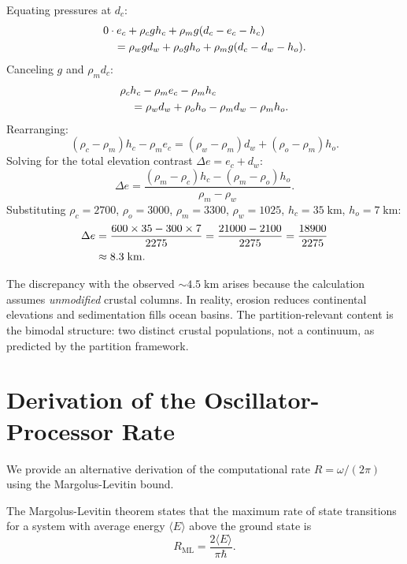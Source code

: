 \documentclass[10pt,twocolumn]{article}
\theoremstyle{definition}
\theoremstyle{remark}
\begin{document}
Equating pressures at $d_c$:
\begin{align}
  &0\cdot e_c + \rho_c g h_c + \rho_m g(d_c - e_c - h_c)\notag\\
  &\quad = \rho_w g d_w + \rho_o g h_o + \rho_m g(d_c - d_w - h_o).
\end{align}
Canceling $g$ and $\rho_m d_c$:
\begin{align}
  &\rho_c h_c - \rho_m e_c - \rho_m h_c\notag\\
  &\quad = \rho_w d_w + \rho_o h_o - \rho_m d_w - \rho_m h_o.
\end{align}
Rearranging:
\begin{equation}
  (\rho_c - \rho_m)h_c - \rho_m e_c
  = (\rho_w - \rho_m)d_w + (\rho_o - \rho_m)h_o.
\end{equation}
Solving for the total elevation contrast
$\Delta e = e_c + d_w$:
\begin{equation}
  \Delta e = \frac{(\rho_m-\rho_c)h_c - (\rho_m-\rho_o)h_o}
                  {\rho_m - \rho_w}.
\end{equation}
Substituting $\rho_c=2700$, $\rho_o=3000$, $\rho_m=3300$,
$\rho_w=1025$, $h_c=35\;\mathrm{km}$, $h_o=7\;\mathrm{km}$:
\begin{align}
  \Delta e &= \frac{600\times 35 - 300\times 7}{2275}
  = \frac{21000-2100}{2275}
  = \frac{18900}{2275}\notag\\
  &\approx 8.3\;\mathrm{km}.
\end{align}

The discrepancy with the observed $\sim 4.5\;\mathrm{km}$
arises because the calculation assumes \emph{unmodified}
crustal columns.  In reality, erosion reduces continental
elevations and sedimentation fills ocean basins.  The
partition-relevant content is the bimodal structure: two
distinct crustal populations, not a continuum, as predicted by
the partition framework.

\section{Derivation of the Oscillator-Processor Rate}
\label{app:osc_proc}

We provide an alternative derivation of the computational rate
$R=\omega/(2\pi)$ using the Margolus-Levitin bound.

The Margolus-Levitin theorem states that the maximum rate of
state transitions for a system with average energy $\langle E\rangle$
above the ground state is
\begin{equation}
  R_{\mathrm{ML}} = \frac{2\langle E\rangle}{\pi\hbar}.
\end{equation}
\end{document}
